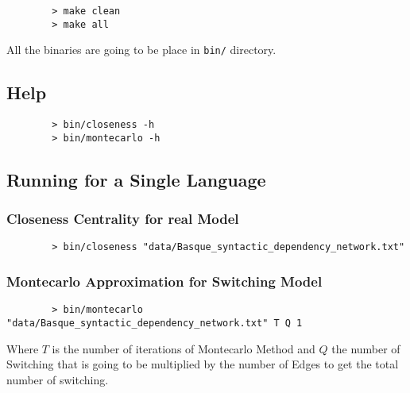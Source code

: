 \documentclass[12pt, a4paper]{article}
\begin{document}
\begin{listing}[H]
    \begin{verbatim}
        > make clean
        > make all
    \end{verbatim}
\end{listing}

All the binaries are going to be place in \texttt{bin/} directory.

\subsection{Help}

\begin{listing}[H]
    \begin{verbatim}
        > bin/closeness -h
        > bin/montecarlo -h
    \end{verbatim}
\end{listing}

\subsection{Running for a Single Language}
\subsubsection{Closeness Centrality for real Model}

\begin{listing}[H]
    \begin{verbatim}
        > bin/closeness "data/Basque_syntactic_dependency_network.txt"
    \end{verbatim}
\end{listing}

\subsubsection{Montecarlo Approximation for Switching Model}

\begin{listing}[H]
    \begin{verbatim}
        > bin/montecarlo "data/Basque_syntactic_dependency_network.txt" T Q 1
    \end{verbatim}
\end{listing}

Where $T$ is the number of iterations of Montecarlo Method and $Q$ the number of Switching that is going to be multiplied by the number of Edges to get the total number of switching.
\end{document}
